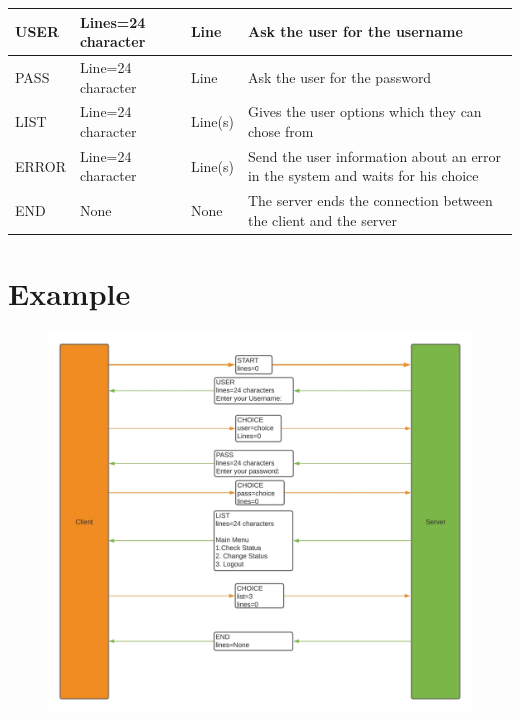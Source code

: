 \documentclass[11pt]{article}
\begin{document}
\begin{table}[H]
{\begin{tabular}{llll}
						\multicolumn{1}{|l|}{USER}                         & \multicolumn{1}{l|}{Lines=24 character}         & \multicolumn{1}{l|}{Line}    & \multicolumn{1}{l|}{Ask the user for the username}                                                          \\ \hline
						\multicolumn{1}{|l|}{PASS}                         & \multicolumn{1}{l|}{Line=24 character}          & \multicolumn{1}{l|}{Line}    & \multicolumn{1}{l|}{Ask the user for the password}                                                          \\ \hline
						\multicolumn{1}{|l|}{LIST}                         & \multicolumn{1}{l|}{Line=24 character}          & \multicolumn{1}{l|}{Line(s)} & \multicolumn{1}{l|}{Gives the user options which they can chose from}                                       \\ \hline
						\multicolumn{1}{|l|}{ERROR}                        & \multicolumn{1}{l|}{Line=24 character}          & \multicolumn{1}{l|}{Line(s)} & \multicolumn{1}{l|}{Send the user information about an error in the system and waits for his choice}        \\ \hline
						\multicolumn{1}{|l|}{END}                          & \multicolumn{1}{l|}{None}                       & \multicolumn{1}{l|}{None}    & \multicolumn{1}{l|}{The server ends the connection between the client and the server}                       \\ \hline
					\end{tabular}%
				}
			\end{table}
	\section*{Example}
		\begin{figure}[H]
			\centering
			\includegraphics[scale=0.5]{Examples}
			\label{fig:examples}
		\end{figure}
\end{document}
